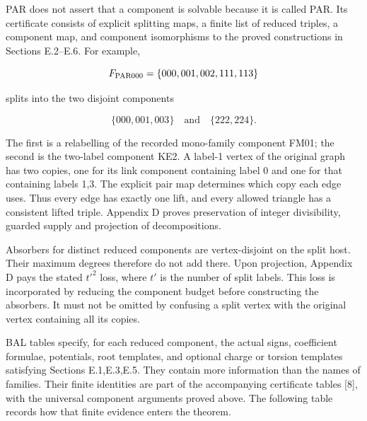 \documentclass[english,11pt,a4paper]{article}
\begin{document}
PAR does not assert that a component is solvable because it is called PAR. Its certificate consists of explicit splitting maps, a finite list of reduced triples, a component map, and component isomorphisms to the proved constructions in Sections E.2--E.6. For example,

\[F_{\rm PAR000}=\{000,001,002,111,113\}\]

splits into the two disjoint components

\[\{000,001,003\}\quad\text{and}\quad\{222,224\}.
\tag{E.7.1}\]

The first is a relabelling of the recorded mono-family component FM01; the second is the two-label component KE2. A label-1 vertex of the original graph has two copies, one for its link component containing label 0 and one for that containing labels 1,3. The explicit pair map determines which copy each edge uses. Thus every edge has exactly one lift, and every allowed triangle has a consistent lifted triple. Appendix D proves preservation of integer divisibility, guarded supply and projection of decompositions.

Absorbers for distinct reduced components are vertex-disjoint on the split host. Their maximum degrees therefore do not add there. Upon projection, Appendix D pays the stated \(t'^2\) loss, where \(t'\) is the number of split labels. This loss is incorporated by reducing the component budget before constructing the absorbers. It must not be omitted by confusing a split vertex with the original vertex containing all its copies.

BAL tables specify, for each reduced component, the actual signs, coefficient formulae, potentials, root templates, and optional charge or torsion templates satisfying Sections E.1,E.3,E.5. They contain more information than the names of families. Their finite identities are part of the accompanying certificate tables {[}8{]}, with the universal component arguments proved above. The following table records how that finite evidence enters the theorem.
\end{document}
